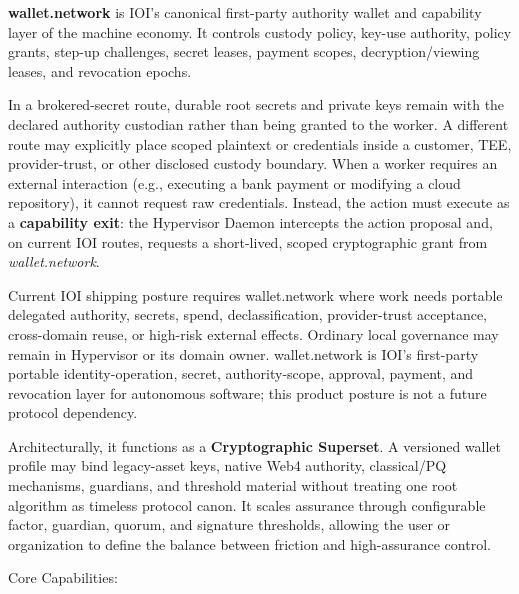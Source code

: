 \documentclass[
  11pt,
]{article}
\begin{document}
\textbf{wallet.network} is IOI's canonical first-party authority wallet and
capability layer of the machine economy. It controls custody policy,
key-use authority, policy grants, step-up challenges, secret leases,
payment scopes, decryption/viewing leases, and revocation epochs.

In a brokered-secret route, durable root secrets and private keys remain with
the declared authority custodian rather than being granted to the worker. A
different route may explicitly place scoped plaintext or credentials inside a
customer, TEE, provider-trust, or other disclosed custody boundary. When a
worker requires an external interaction
(e.g., executing a bank payment or modifying a cloud repository), it
cannot request raw credentials. Instead, the action must execute as a
\textbf{capability exit}: the Hypervisor Daemon intercepts the action
proposal and, on current IOI routes, requests a short-lived, scoped
cryptographic grant from \emph{wallet.network}.

Current IOI shipping posture requires wallet.network where work needs portable
delegated authority, secrets, spend, declassification, provider-trust
acceptance, cross-domain reuse, or high-risk external effects. Ordinary local
governance may remain in Hypervisor or its domain owner. wallet.network is
IOI's first-party portable identity-operation, secret, authority-scope,
approval, payment, and revocation layer for autonomous software; this product
posture is not a future protocol dependency.

Architecturally, it functions as a \textbf{Cryptographic Superset}. A
versioned wallet profile may bind legacy-asset keys, native Web4 authority,
classical/PQ mechanisms, guardians, and threshold material without treating
one root algorithm as timeless protocol canon. It scales assurance through
configurable factor, guardian, quorum, and signature thresholds, allowing the
user or organization to define the balance between friction and high-assurance
control.

Core Capabilities:
\end{document}
